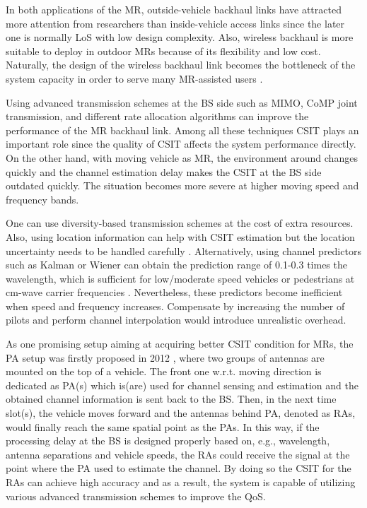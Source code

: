 \documentclass[conference]{IEEEtran}
\begin{document}
In both applications of the \ac{MR}, outside-vehicle backhaul links have attracted more attention from researchers than inside-vehicle access links since the later one is normally \ac{LoS} with low design complexity. Also, wireless backhaul is more suitable to deploy in outdoor \acp{MR} because of its flexibility and low cost. Naturally, the design of the wireless backhaul link becomes the bottleneck of the system capacity in order to serve many \ac{MR}-assisted users \cite{yutao2013moving}. 

Using advanced transmission schemes at the \ac{BS} side such as \ac{MIMO}, \ac{CoMP} joint transmission, and different rate allocation algorithms can improve the performance of the \ac{MR} backhaul link. Among all these techniques \ac{CSIT} plays an important role since the quality of \ac{CSIT} affects the system performance directly. On the other hand, with moving vehicle as \ac{MR}, the environment around changes quickly and the channel estimation delay makes the \ac{CSIT} at the \ac{BS} side outdated quickly. The situation becomes more severe at higher moving speed and frequency bands. 

One can use diversity-based transmission schemes at the cost of extra resources. Also, using location information can help with \ac{CSIT} estimation but the location uncertainty needs to be handled carefully \cite{srikar2016twc}. Alternatively, using channel predictors such as Kalman or Wiener can obtain the prediction range of 0.1-0.3 times the wavelength, which is sufficient for low/moderate speed vehicles or pedestrians  at cm-wave carrier frequencies \cite{Sternad2012WCNCWusing}. Nevertheless, these predictors become inefficient when speed and frequency increases.  Compensate by increasing the number of pilots and perform channel interpolation would introduce unrealistic overhead.

As one promising setup aiming at acquiring better \ac{CSIT} condition for \acp{MR}, the \ac{PA} setup was firstly proposed in 
2012 \cite{Sternad2012WCNCWusing}, where two groups of antennas are mounted on the top of a vehicle. The front one w.r.t. moving direction is dedicated as \ac{PA}(s) which is(are) used for channel sensing and estimation and the obtained channel information is sent back to the \ac{BS}. Then, in the next time slot(s), the vehicle moves forward and the antennas behind \ac{PA}, denoted as \acp{RA}, would finally reach the same spatial point as the \acp{PA}. In this way, if the processing delay at the \ac{BS} is designed properly based on, e.g., wavelength, antenna separations and vehicle speeds, the \acp{RA} could receive the signal at the point where the \ac{PA} used to estimate the channel. By doing so the \ac{CSIT} for the \acp{RA} can achieve high accuracy and as a result, the system is capable of utilizing various advanced transmission schemes to improve the \ac{QoS}.
\end{document}

